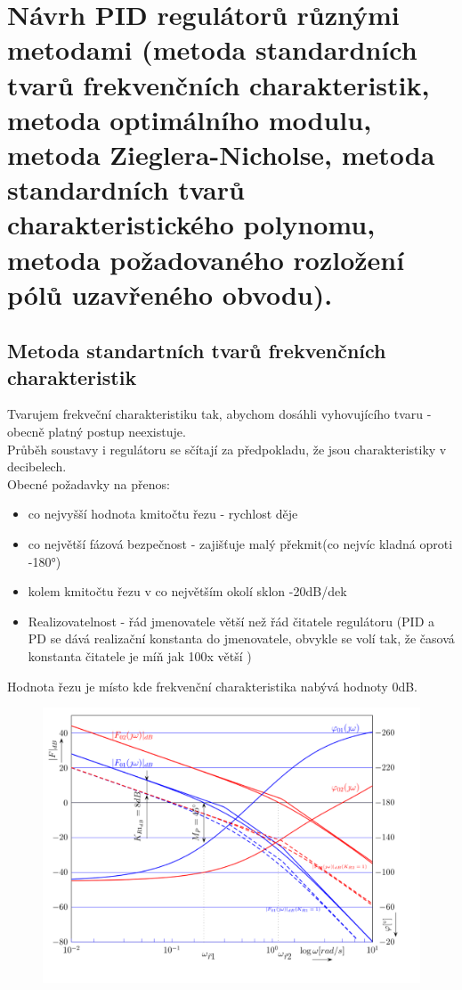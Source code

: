 \section{ Návrh PID regulátorů různými metodami (metoda standardních tvarů frekvenčních charakteristik, metoda optimálního
  modulu, metoda Zieglera-Nicholse, metoda standardních tvarů charakteristického polynomu, metoda požadovaného
  rozložení pólů uzavřeného obvodu).}

\subsection*{Metoda standartních tvarů frekvenčních charakteristik}

Tvarujem frekveční charakteristiku tak, abychom dosáhli vyhovujícího tvaru - obecně platný postup neexistuje.\\
Průběh soustavy i regulátoru se sčítají za předpokladu, že jsou charakteristiky v decibelech.\\
Obecné požadavky na přenos:
\begin{itemize}
    \item co nejvyšší hodnota kmitočtu řezu - rychlost děje
    \item co největší fázová bezpečnost - zajišťuje malý překmit(co nejvíc kladná oproti -180°)
    \item kolem kmitočtu řezu v co největším okolí sklon -20dB/dek
    \item Realizovatelnost - řád jmenovatele větší než řád čitatele regulátoru (PID a PD se dává realizační konstanta do jmenovatele, obvykle se volí tak, že časová konstanta čitatele je míň jak 100x větší )
\end{itemize}
Hodnota řezu je místo kde frekvenční charakteristika nabývá hodnoty 0dB.
\begin{figure}[H]
    \includegraphics*[scale = 0.8]{images/freqNavrh.png}
\end{figure}
\newpage

